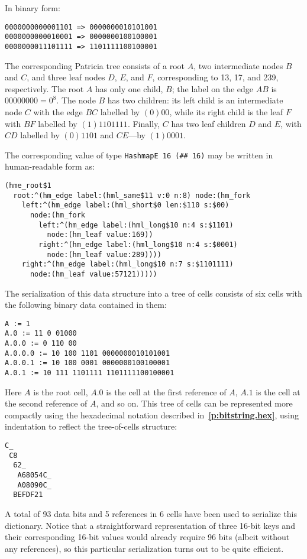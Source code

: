 \documentclass[12pt,oneside]{article}
\def\refpoint#1{{\rm\textbf{\ref{#1}}}}
\let\ptref=\refpoint
\begin{document}
In binary form:
\begin{verbatim}
0000000000001101 => 0000000010101001
0000000000010001 => 0000000100100001
0000000011101111 => 1101111100100001
\end{verbatim}

The corresponding Patricia tree consists of a root $A$, two intermediate nodes $B$ and $C$, and three leaf nodes $D$, $E$, and $F$, corresponding to 13, 17, and 239, respectively. The root $A$ has only one child, $B$; the label on the edge $AB$ is $00000000=0^8$. The node $B$ has two children: its left child is an intermediate node $C$ with the edge $BC$ labelled by $(0)00$, while its right child is the leaf $F$ with $BF$ labelled by $(1)1101111$. Finally, $C$ has two leaf children $D$ and $E$, with $CD$ labelled by $(0)1101$ and $CE$---by $(1)0001$.

The corresponding value of type {\tt HashmapE 16 (\#\# 16)} may be written in human-readable form as:
\begin{verbatim}
(hme_root$1 
  root:^(hm_edge label:(hml_same$11 v:0 n:8) node:(hm_fork 
    left:^(hm_edge label:(hml_short$0 len:$110 s:$00) 
      node:(hm_fork
        left:^(hm_edge label:(hml_long$10 n:4 s:$1101) 
          node:(hm_leaf value:169))
        right:^(hm_edge label:(hml_long$10 n:4 s:$0001) 
          node:(hm_leaf value:289))))
    right:^(hm_edge label:(hml_long$10 n:7 s:$1101111) 
      node:(hm_leaf value:57121)))))
\end{verbatim}

The serialization of this data structure into a tree of cells consists of six cells with the following binary data contained in them:
\begin{verbatim}
A := 1
A.0 := 11 0 01000 
A.0.0 := 0 110 00
A.0.0.0 := 10 100 1101 0000000010101001
A.0.0.1 := 10 100 0001 0000000100100001
A.0.1 := 10 111 1101111 1101111100100001
\end{verbatim}
Here $A$ is the root cell, $A.0$ is the cell at the first reference of $A$, $A.1$ is the cell at the second reference of $A$, and so on. This tree of cells can be represented more compactly using the hexadecimal notation described in~\ptref{p:bitstring.hex}, using indentation to reflect the tree-of-cells structure:
\begin{verbatim}
C_
 C8
  62_
   A68054C_
   A08090C_
  BEFDF21
\end{verbatim}
A total of 93 data bits and 5 references in 6 cells have been used to serialize this dictionary. Notice that a straightforward representation of three 16-bit keys and their corresponding 16-bit values would already require 96 bits (albeit without any references), so this particular serialization turns out to be quite efficient.
\end{document}
